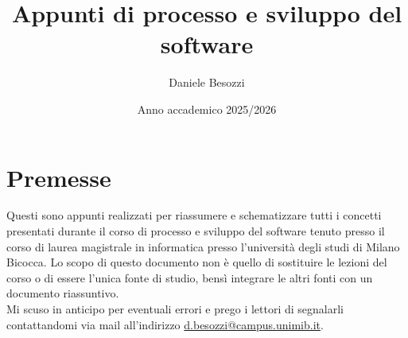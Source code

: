 \documentclass[10pt,openany,onesided]{book}
\title{Appunti di processo e sviluppo del software}
\author{Daniele Besozzi}
\date{Anno accademico 2025/2026}
\begin{document}
\frontmatter
\maketitle	
\tableofcontents
\newpage
\mainmatter
\chapter*{Premesse}
Questi sono appunti realizzati per riassumere e schematizzare tutti i concetti presentati durante il corso di processo e sviluppo del software tenuto presso il corso di laurea magistrale in informatica presso l'università degli studi di Milano Bicocca.
Lo scopo di questo documento non è quello di sostituire le lezioni del corso o di essere l'unica fonte di studio, bensì integrare le altri fonti con un documento riassuntivo.
\\
Mi scuso in anticipo per eventuali errori e prego i lettori di segnalarli contattandomi via mail all'indirizzo \href{mailto:d.besozzi@campus.unimib.it}{d.besozzi@campus.unimib.it}.

\end{document}
